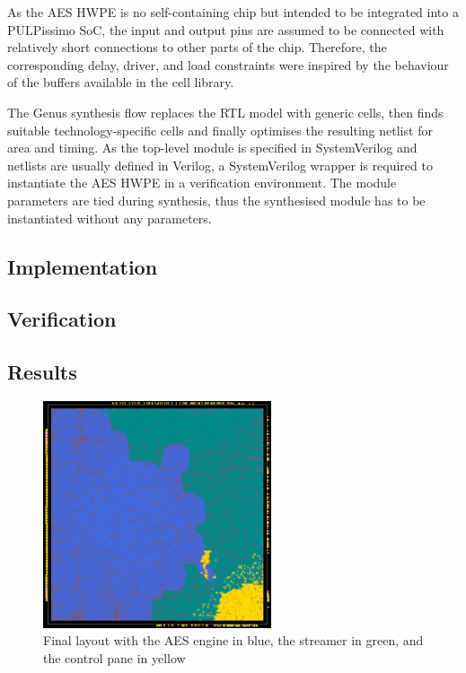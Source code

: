 \documentclass[a4paper, 12pt]{article}
\begin{document}
As the AES HWPE is no self-containing chip but intended to be integrated into a PULPissimo SoC, the input and output pins are assumed to be connected with relatively short connections to other parts of the chip. Therefore, the corresponding delay, driver, and load constraints were inspired by the behaviour of the buffers available in the cell library.

The Genus synthesis flow replaces the RTL model with generic cells, then finds suitable technology-specific cells and finally optimises the resulting netlist for area and timing. As the top-level module is specified in SystemVerilog and netlists are usually defined in Verilog, a SystemVerilog wrapper is required to instantiate the AES HWPE in a verification environment. The module parameters are tied during synthesis, thus the synthesised module has to be instantiated without any parameters.

\subsection{Implementation} \label{sec:asic:impl}










\subsection{Verification} \label{sec:asic:verification}

\subsection{Results} \label{sec:asic:results}



\begin{figure} [h]
	\centering
	\includegraphics[width=0.6\textwidth]{layout.png}
	\caption{Final layout with the AES engine in blue, the streamer in green, and the control pane in yellow}
	\label{fig:layout}
\end{figure}
\end{document}
